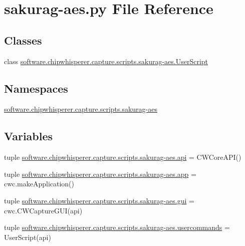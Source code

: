 \hypertarget{sakurag-aes_8py}{}\section{sakurag-\/aes.py File Reference}
\label{sakurag-aes_8py}
\subsection*{Classes}
\begin{DoxyCompactItemize}
\item 
class \hyperlink{classsoftware_1_1chipwhisperer_1_1capture_1_1scripts_1_1sakurag-aes_1_1UserScript}{software.\+chipwhisperer.\+capture.\+scripts.\+sakurag-\/aes.\+User\+Script}
\end{DoxyCompactItemize}
\subsection*{Namespaces}
\begin{DoxyCompactItemize}
\item 
 \hyperlink{namespacesoftware_1_1chipwhisperer_1_1capture_1_1scripts_1_1sakurag-aes}{software.\+chipwhisperer.\+capture.\+scripts.\+sakurag-\/aes}
\end{DoxyCompactItemize}
\subsection*{Variables}
\begin{DoxyCompactItemize}
\item 
tuple \hyperlink{namespacesoftware_1_1chipwhisperer_1_1capture_1_1scripts_1_1sakurag-aes_a0a6143af4cb02c4fc4effc737f95578b}{software.\+chipwhisperer.\+capture.\+scripts.\+sakurag-\/aes.\+api} = C\+W\+Core\+A\+P\+I()
\item 
tuple \hyperlink{namespacesoftware_1_1chipwhisperer_1_1capture_1_1scripts_1_1sakurag-aes_a5c11107ac86d47d4fe6628b9e67acaad}{software.\+chipwhisperer.\+capture.\+scripts.\+sakurag-\/aes.\+app} = cwc.\+make\+Application()
\item 
tuple \hyperlink{namespacesoftware_1_1chipwhisperer_1_1capture_1_1scripts_1_1sakurag-aes_a8034c90052e4725e000257765d5ff701}{software.\+chipwhisperer.\+capture.\+scripts.\+sakurag-\/aes.\+gui} = cwc.\+C\+W\+Capture\+G\+U\+I(api)
\item 
tuple \hyperlink{namespacesoftware_1_1chipwhisperer_1_1capture_1_1scripts_1_1sakurag-aes_a92558e549001a1a6bc740a54bc8d27d0}{software.\+chipwhisperer.\+capture.\+scripts.\+sakurag-\/aes.\+usercommands} = User\+Script(api)
\end{DoxyCompactItemize}
